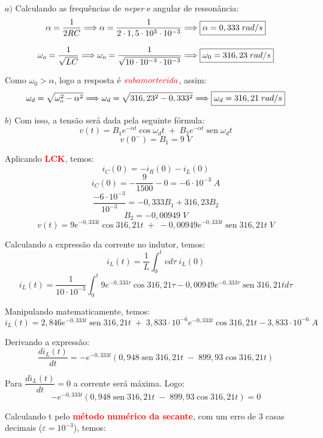 \documentclass[
	12pt,				%
	oneside,			%
	a4paper,			%
	english,			%
	french,				%
	spanish,			%
	brazil				%
	]{abntex2}
\DeclareMathOperator{\sen}{sen}
\begin{document}
$a)$ Calculando as frequências de \textit{neper} e angular de ressonância:
\begin{equation}
    \centering
    \alpha=\dfrac{1}{2 R C} \Longrightarrow \alpha=\dfrac{1}{2\cdot1,5\cdot10^3\cdot10^{-3}} \Longrightarrow  \fbox{$\alpha=0,333\;rad/s$}
\end{equation}

\begin{equation}
    \centering
    \omega_o=\dfrac{1}{\sqrt{L C}} \Longrightarrow \omega_o=\dfrac{1}{\sqrt{10\cdot10^{-3}\cdot10^{-3}}} \Longrightarrow \fbox{$\omega_0=316,23\;rad/s$}
\end{equation}

Como $\omega_0>\alpha$, logo a resposta é $\textcolor{red}{subamortecida}$, assim:
\begin{equation}
    \centering
    \omega_d=\sqrt{\omega_o^2-\alpha^2} \Longrightarrow \omega_d=\sqrt{316,23^2-0,333^2} \Longrightarrow \fbox{$\omega_d=316,21\;rad/s$}
\end{equation}

$b)$ Com isso, a tensão será dada pela seguinte fórmula:
$$v(t)=B_1 e^{-\alpha t} \cos{\omega_d t}\;+\;B_2 e^{-\alpha t} \sen{\omega_d t}$$
$$v(0^-)=B_1=9\;V$$

Aplicando \textbf{\textcolor{red}{LCK}}, temos:
$$i_C(0)=-i_R(0)-i_L(0)$$
$$i_C(0)=-\dfrac{9}{1500}-0=-6\cdot10^{-3}\;A$$
$$\dfrac{-6\cdot10^{-3}}{10^{-3}}=-0,333 B_1+316,23B_2$$
$$B_2=-0,00949\;V$$
\newpage
$$v(t)=9 e^{-0,333 t} \cos{316,21 t}\;+\;-0,00949 e^{-0,333 t} \sen{316,21 t} \;V$$

Calculando a expressão da corrente no indutor, temos:
$$i_L(t)=\dfrac{1}{L}\int_{0}^{t}vd\tau\;i_L(0)$$
$$i_L(t)=\dfrac{1}{10\cdot10^{-3}}\int_{0}^{t}9 e^{-0,333\tau} \cos{316,21\tau}-0,00949 e^{-0,333\tau} \sen{316,21 t}d\tau$$

Manipulando matematicamente, temos:
$$i_L(t)=2,846e^{-0,333t}\sen{316,21t}\;+\;3,833\cdot10^{-6}e^{-0,333t}\cos{316,21t}-3,833\cdot10^{-6}\;A$$

Derivando a expressão:
$$\dfrac{di_L(t)}{dt}=-e^{-0,333t}(0,948\sen{316,21t}\;-\;899,93\cos{316,21t})$$

Para $\dfrac{di_L(t)}{dt}=0$ a corrente será máxima. Logo:
$$-e^{-0,333t}(0,948\sen{316,21t}\;-\;899,93\cos{316,21t})=0$$

Calculando t pelo \textbf{\textcolor{red}{método numérico da secante}}, com um erro de 3 casas decimais ($\varepsilon = 10^{-3}$), temos:
\end{document}
